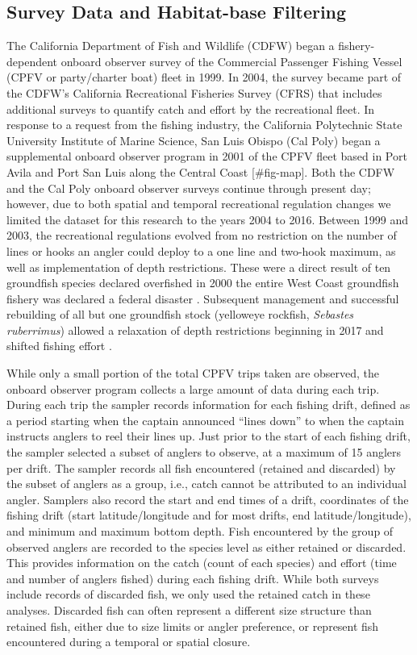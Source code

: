 \documentclass[
  authoryear,
  preprint,
  3p]{elsarticle}
\begin{document}
\hypertarget{survey-data-and-habitat-base-filtering}{%
\subsection{Survey Data and Habitat-base
Filtering}\label{survey-data-and-habitat-base-filtering}}

The California Department of Fish and Wildlife (CDFW) began a
fishery-dependent onboard observer survey of the Commercial Passenger
Fishing Vessel (CPFV or party/charter boat) fleet in 1999. In 2004, the
survey became part of the CDFW's California Recreational Fisheries
Survey (CFRS) that includes additional surveys to quantify catch and
effort by the recreational fleet. In response to a request from the
fishing industry, the California Polytechnic State University Institute
of Marine Science, San Luis Obispo (Cal Poly) began a supplemental
onboard observer program in 2001 of the CPFV fleet based in Port Avila
and Port San Luis along the Central Coast {[}\#fig-map{]}. Both the CDFW
and the Cal Poly onboard observer surveys continue through present day;
however, due to both spatial and temporal recreational regulation
changes we limited the dataset for this research to the years 2004 to
2016. Between 1999 and 2003, the recreational regulations evolved from
no restriction on the number of lines or hooks an angler could deploy to
a one line and two-hook maximum, as well as implementation of depth
restrictions. These were a direct result of ten groundfish species
declared overfished in 2000 the entire West Coast groundfish fishery was
declared a federal disaster \citep{Conway:2008:SLL}. Subsequent
management and successful rebuilding of all but one groundfish stock
(yelloweye rockfish, \emph{Sebastes ruberrimus}) allowed a relaxation of
depth restrictions beginning in 2017 and shifted fishing effort
\citep{Monk:2021:SVR}.

While only a small portion of the total CPFV trips taken are observed,
the onboard observer program collects a large amount of data during each
trip. During each trip the sampler records information for each fishing
drift, defined as a period starting when the captain announced ``lines
down'' to when the captain instructs anglers to reel their lines up.
Just prior to the start of each fishing drift, the sampler selected a
subset of anglers to observe, at a maximum of 15 anglers per drift. The
sampler records all fish encountered (retained and discarded) by the
subset of anglers as a group, i.e., catch cannot be attributed to an
individual angler. Samplers also record the start and end times of a
drift, coordinates of the fishing drift (start latitude/longitude and
for most drifts, end latitude/longitude), and minimum and maximum bottom
depth. Fish encountered by the group of observed anglers are recorded to
the species level as either retained or discarded. This provides
information on the catch (count of each species) and effort (time and
number of anglers fished) during each fishing drift. While both surveys
include records of discarded fish, we only used the retained catch in
these analyses. Discarded fish can often represent a different size
structure than retained fish, either due to size limits or angler
preference, or represent fish encountered during a temporal or spatial
closure.
\end{document}

